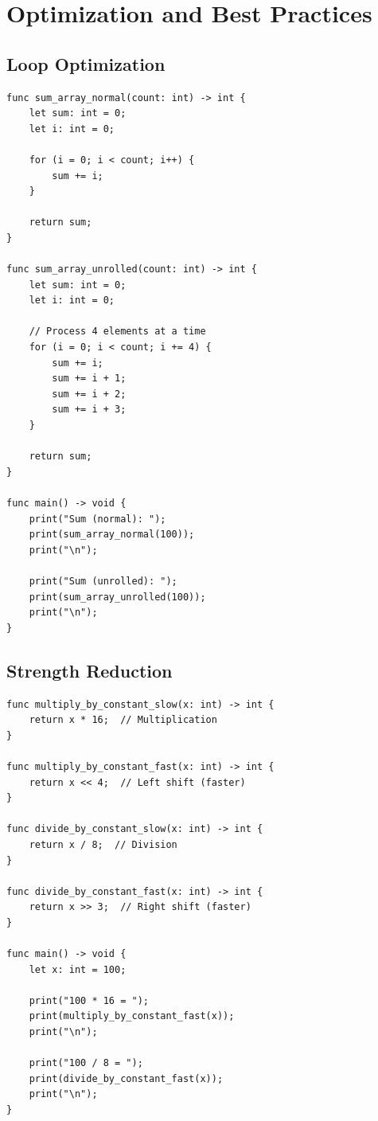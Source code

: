 \documentclass[12pt,a4paper,oneside]{book}
\begin{document}
\chapter{Optimization and Best Practices}

\section{Loop Optimization}

\begin{lstlisting}[style=algo, caption={Loop Unrolling}]
func sum_array_normal(count: int) -> int {
    let sum: int = 0;
    let i: int = 0;
    
    for (i = 0; i < count; i++) {
        sum += i;
    }
    
    return sum;
}

func sum_array_unrolled(count: int) -> int {
    let sum: int = 0;
    let i: int = 0;
    
    // Process 4 elements at a time
    for (i = 0; i < count; i += 4) {
        sum += i;
        sum += i + 1;
        sum += i + 2;
        sum += i + 3;
    }
    
    return sum;
}

func main() -> void {
    print("Sum (normal): ");
    print(sum_array_normal(100));
    print("\n");
    
    print("Sum (unrolled): ");
    print(sum_array_unrolled(100));
    print("\n");
}
\end{lstlisting}

\section{Strength Reduction}

\begin{lstlisting}[style=algo, caption={Replace Expensive Operations}]
func multiply_by_constant_slow(x: int) -> int {
    return x * 16;  // Multiplication
}

func multiply_by_constant_fast(x: int) -> int {
    return x << 4;  // Left shift (faster)
}

func divide_by_constant_slow(x: int) -> int {
    return x / 8;  // Division
}

func divide_by_constant_fast(x: int) -> int {
    return x >> 3;  // Right shift (faster)
}

func main() -> void {
    let x: int = 100;
    
    print("100 * 16 = ");
    print(multiply_by_constant_fast(x));
    print("\n");
    
    print("100 / 8 = ");
    print(divide_by_constant_fast(x));
    print("\n");
}
\end{lstlisting}
\end{document}
